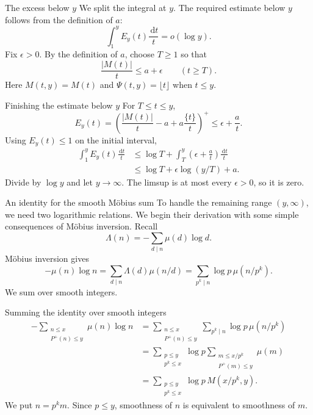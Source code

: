 \documentclass[aspectratio=169,11pt]{beamer}
\newcommand{\dd}{\,\mathrm d}
\begin{document}
\begin{frame}{The excess below $y$}
We split the integral at $y$. The required estimate below $y$ follows from the definition of $a$:
\[\int_1^y E_y(t)\frac{\dd t}t=o(\log y).\]
Fix $\epsilon>0$. By the definition of $a$, choose $T\ge1$ so that
\[\frac{|M(t)|}t\le a+\epsilon\qquad(t\ge T).\]
Here $M(t,y)=M(t)$ and $\Psi(t,y)=\lfloor t\rfloor$ when $t\le y$.
\end{frame}
\begin{frame}{Finishing the estimate below $y$}
For $T\le t\le y$,
\[E_y(t)=\left(\frac{|M(t)|}t-a+a\frac{\{t\}}t\right)^+\le\epsilon+\frac at.\]
Using $E_y(t)\le1$ on the initial interval,
\begin{align*}
\int_1^y E_y(t)\frac{\dd t}t
&\le\log T+\int_T^y\left(\epsilon+\frac at\right)\frac{\dd t}t\\
&\le\log T+\epsilon\log(y/T)+a.
\end{align*}
Divide by $\log y$ and let $y\to\infty$. The limsup is at most every $\epsilon>0$, so it is zero.
\end{frame}
\begin{frame}{An identity for the smooth M\"obius sum}
To handle the remaining range $(y,\infty)$, we need two logarithmic relations. We begin their derivation with some simple consequences of M\"obius inversion. Recall
\[\Lambda(n)=-\sum_{d\mid n}\mu(d)\log d.\]
M\"obius inversion gives
\[-\mu(n)\log n=\sum_{d\mid n}\Lambda(d)\mu(n/d)
=\sum_{p^k\mid n}\log p\,\mu(n/p^k).\]
We sum over smooth integers.
\end{frame}
\begin{frame}{Summing the identity over smooth integers}
\begin{align*}
-\sum_{\substack{n\le x\\P^+(n)\le y}}\mu(n)\log n
&=\sum_{\substack{n\le x\\P^+(n)\le y}}\sum_{p^k\mid n}\log p\,\mu(n/p^k)\\
&=\sum_{\substack{p\le y\\p^k\le x}}\log p
\sum_{\substack{m\le x/p^k\\P^+(m)\le y}}\mu(m)\\
&=\sum_{\substack{p\le y\\p^k\le x}}\log p\,M(x/p^k,y).
\end{align*}
We put $n=p^km$. Since $p\le y$, smoothness of $n$ is equivalent to smoothness of $m$.
\end{frame}
\end{document}
